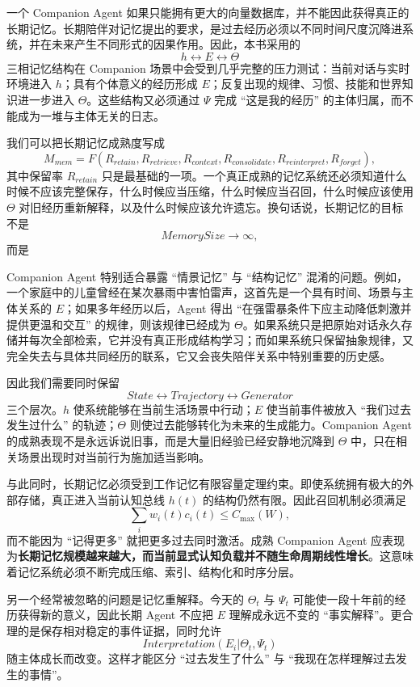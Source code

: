 一个 Companion Agent 如果只能拥有更大的向量数据库，并不能因此获得真正的长期记忆。长期陪伴对记忆提出的要求，是过去经历必须以不同时间尺度沉降进系统，并在未来产生不同形式的因果作用。因此，本书采用的
\[
h\leftrightarrow E\leftrightarrow\Theta
\]
三相记忆结构在 Companion 场景中会受到几乎完整的压力测试：当前对话与实时环境进入 $h$；具有个体意义的经历形成 $E$；反复出现的规律、习惯、技能和世界知识进一步进入 $\Theta$。这些结构又必须通过 $\Psi$ 完成 ``这是我的经历'' 的主体归属，而不能成为一堆与主体无关的日志。

我们可以把长期记忆成熟度写成
\[
M_{mem}
=
F
\left(
R_{retain},
R_{retrieve},
R_{context},
R_{consolidate},
R_{reinterpret},
R_{forget}
\right),
\]
其中保留率 $R_{retain}$ 只是最基础的一项。一个真正成熟的记忆系统还必须知道什么时候不应该完整保存，什么时候应当压缩，什么时候应当召回，什么时候应该使用 $\Theta$ 对旧经历重新解释，以及什么时候应该允许遗忘。换句话说，长期记忆的目标不是
\[
MemorySize\rightarrow\infty,
\]
而是
\begin{statementbox}
\centering
{}
\end{statementbox}

Companion Agent 特别适合暴露 ``情景记忆'' 与 ``结构记忆'' 混淆的问题。例如，一个家庭中的儿童曾经在某次暴雨中害怕雷声，这首先是一个具有时间、场景与主体关系的 $E$；如果多年经历以后，Agent 得出 ``在强雷暴条件下应主动降低刺激并提供更温和交互'' 的规律，则该规律已经成为 $\Theta$。如果系统只是把原始对话永久存储并每次全部检索，它并没有真正形成结构学习；而如果系统只保留抽象规律，又完全失去与具体共同经历的联系，它又会丧失陪伴关系中特别重要的历史感。

因此我们需要同时保留
\[
State
\leftrightarrow
Trajectory
\leftrightarrow
Generator
\]
三个层次。$h$ 使系统能够在当前生活场景中行动；$E$ 使当前事件被放入 ``我们过去发生过什么'' 的轨迹；$\Theta$ 则使过去能够转化为未来的生成能力。Companion Agent 的成熟表现不是永远诉说旧事，而是大量旧经验已经安静地沉降到 $\Theta$ 中，只在相关场景出现时对当前行为施加适当影响。

与此同时，长期记忆必须受到工作记忆有限容量定理约束。即使系统拥有极大的外部存储，真正进入当前认知总线 $h(t)$ 的结构仍然有限。因此召回机制必须满足
\[
\sum_i
w_i(t)c_i(t)
\leq
C_{\max}(W),
\]
而不能因为 ``记得更多'' 就把更多过去同时激活。成熟 Companion Agent 应表现为\textbf{长期记忆规模越来越大，而当前显式认知负载并不随生命周期线性增长}。这意味着记忆系统必须不断完成压缩、索引、结构化和时序分层。

另一个经常被忽略的问题是记忆重解释。今天的 $\Theta_t$ 与 $\Psi_t$ 可能使一段十年前的经历获得新的意义，因此长期 Agent 不应把 $E$ 理解成永远不变的 ``事实解释''。更合理的是保存相对稳定的事件证据，同时允许
\[
Interpretation(E_i|\Theta_t,\Psi_t)
\]
随主体成长而改变。这样才能区分 ``过去发生了什么'' 与 ``我现在怎样理解过去发生的事情''。

